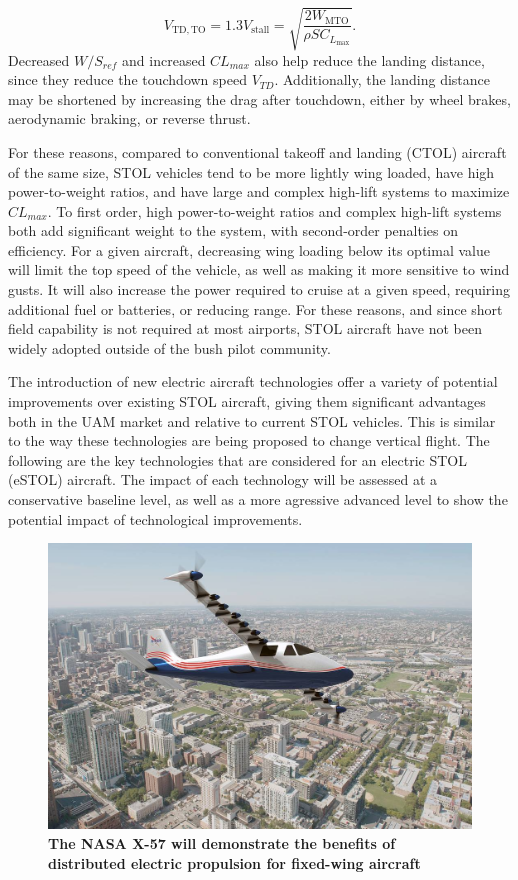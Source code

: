 \documentclass[]{aiaa-tc}%
\begin{document}
\begin{equation}
    \label{e:stall}
    V_{\mathrm{TD,TO}} = 1.3V_{\mathrm{stall}} = \sqrt{\frac{2W_{\mathrm{MTO}}}{\rho S C_{L_{\mathrm{max}}}}}.
\end{equation}
Decreased $W/S_{ref}$ and increased $CL_{max}$ also help reduce the landing distance, since they reduce the touchdown speed $V_{TD}$.  Additionally, the landing distance may be shortened by increasing the drag after touchdown, either by wheel brakes, aerodynamic braking, or reverse thrust.  

For these reasons, compared to conventional takeoff and landing (CTOL) aircraft of the same size, STOL vehicles tend to be more lightly wing loaded, have high power-to-weight ratios, and have large and complex high-lift systems to maximize $CL_{max}$.  To first order, high power-to-weight ratios and complex high-lift systems both add significant weight to the system, with second-order penalties on efficiency.  For a given aircraft, decreasing wing loading below its optimal value will limit the top speed of the vehicle, as well as making it more sensitive to wind gusts.  It will also increase the power required to cruise at a given speed, requiring additional fuel or batteries, or reducing range.  For these reasons, and since short field capability is not required at most airports, STOL aircraft have not been widely adopted outside of the bush pilot community. 

The introduction of new electric aircraft technologies offer a variety of potential improvements over existing STOL aircraft, giving them significant advantages both in the UAM market and relative to current STOL vehicles.  This is similar to the way these technologies are being proposed to change vertical flight.  The following are the key technologies that are considered for an electric STOL (eSTOL) aircraft.  The impact of each technology will be assessed at a conservative baseline level, as well as a more agressive advanced level to show the potential impact of technological improvements.  
\begin{figure}
	\begin{center}
	\includegraphics{x-57.jpg}
    \caption{\textbf{The NASA X-57 will demonstrate the benefits of distributed electric propulsion for fixed-wing aircraft ~\cite{NASAWeb}}}
	\label{f:x57}
	\end{center}
\end{figure}
\end{document}
